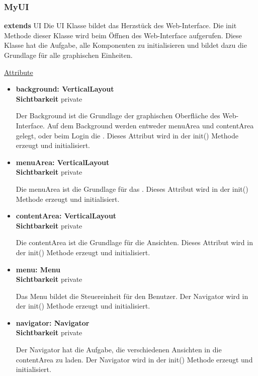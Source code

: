 \subsubsection{MyUI}\label{MyUI}
\textbf{extends} UI \newline
Die UI Klasse bildet das Herzstück des Web-Interface. Die init Methode dieser Klasse wird beim Öffnen des Web-Interface aufgerufen. Diese Klasse hat die Aufgabe, alle Komponenten zu initialisieren und bildet dazu die Grundlage für alle graphischen Einheiten.
\newline

\underline{Attribute}
\begin{itemize}
\itemsep0pt

\item \textbf{background: VerticalLayout} \hfill\\ 
\textbf{Sichtbarkeit} private

Der Background ist die Grundlage der graphischen Oberfläche des Web-Interface. Auf dem Background werden entweder menuArea und contentArea gelegt, oder beim Login die . Dieses Attribut wird in der init() Methode erzeugt und initialisiert.

\item \textbf{menuArea: VerticalLayout} \hfill\\ 
\textbf{Sichtbarkeit} private

Die menuArea ist die Grundlage für das . Dieses Attribut wird in der init() Methode erzeugt und initialisiert.

\item \textbf{contentArea: VerticalLayout} \hfill\\ 
\textbf{Sichtbarkeit} private

Die contentArea ist die Grundlage für die Ansichten. Dieses Attribut wird in der init() Methode erzeugt und initialisiert.

\item \textbf{menu: Menu} \hfill\\
\textbf{Sichtbarkeit} private
 
Das Menu bildet die Steuereinheit für den Benutzer. Der Navigator wird in der init() Methode erzeugt und initialisiert.

\item \textbf{navigator: Navigator} \hfill\\ 
\textbf{Sichtbarkeit} private

Der Navigator hat die Aufgabe, die verschiedenen Ansichten in die contentArea zu laden. Der Navigator wird in der init() Methode erzeugt und initialisiert.

\end{itemize}

